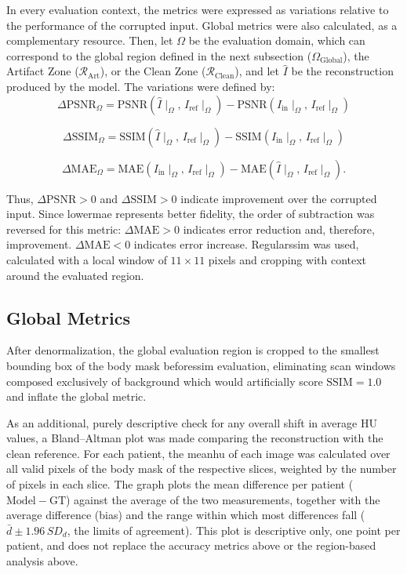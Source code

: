 In every evaluation context, the metrics were expressed as variations relative to the performance of the corrupted input. Global metrics were also calculated, as a complementary resource. Then, let $\Omega$ be the evaluation domain, which can correspond to the global region defined in the next subsection ($\Omega_{\mathrm{ Global}}$), the Artifact Zone ($\mathcal{R}_{\mathrm{ Art}}$), or the Clean Zone ($\mathcal{R}_{\mathrm{ Clean}}$), and let $\hat I$ be the reconstruction produced by the model. The variations were defined by:
\[
\Delta\mathrm{PSNR}_{\Omega} = \mathrm{PSNR}(\hat I\mid_{\Omega},\, I_{\mathrm{ref}}\mid_{\Omega}) - \mathrm{PSNR}(I_{\mathrm{in}}\mid_{\Omega},\, I_{\mathrm{ref}}\mid_{\Omega})
\]

\[
\Delta\mathrm{SSIM}_{\Omega} = \mathrm{SSIM}(\hat I\mid_{\Omega},\, I_{\mathrm{ref}}\mid_{\Omega}) - \mathrm{SSIM}(I_{\mathrm{in}}\mid_{\Omega},\, I_{\mathrm{ref}}\mid_{\Omega})
\]

\[
\Delta\mathrm{MAE}_{\Omega} = \mathrm{MAE}(I_{\mathrm{in}}\mid_{\Omega},\, I_{\mathrm{ref}}\mid_{\Omega}) - \mathrm{MAE}(\hat I\mid_{\Omega},\, I_{\mathrm{ref}}\mid_{\Omega}).
\]

Thus, $\Delta\mathrm{PSNR}>0$ and $\Delta\mathrm{SSIM}>0$ indicate improvement over the corrupted input. Since lower\acrshort{mae} represents better fidelity, the order of subtraction was reversed for this metric: $\Delta\mathrm{MAE}>0$ indicates error reduction and, therefore, improvement. $\Delta\mathrm{MAE}<0$ indicates error increase. Regular\acrshort{ssim} was used, calculated with a local window of $11\times11$ pixels and cropping with context around the evaluated region.
\subsection{Global Metrics}
 After denormalization, the global evaluation region is cropped to the smallest bounding box of the body mask before\acrshort{ssim} evaluation, eliminating scan windows composed exclusively of background which would artificially score $\text{SSIM} = 1{.}0$ and inflate the global metric.  

As an additional, purely descriptive check for any overall shift in average HU values, a Bland--Altman plot was made comparing the reconstruction with the clean reference. For each patient, the mean\acrshort{hu} of each image was calculated over all valid pixels of the body mask of the respective slices, weighted by the number of pixels in each slice. The graph plots the mean difference per patient ($\mathrm{Model}-\mathrm{GT}$) against the average of the two measurements, together with the average difference (bias) and the range within which most differences fall ($\bar d \pm 1{.}96\,SD_d$, the limits of agreement). This plot is descriptive only, one point per patient, and does not replace the accuracy metrics above or the region-based analysis above.


